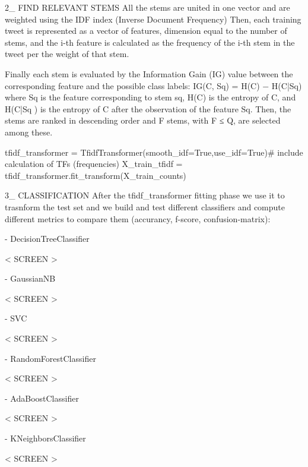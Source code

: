 \documentclass[a4paper]{article}
\begin{document}
                
                
2_ FIND RELEVANT STEMS
    All the stems are united in one vector and are weighted using the IDF index (Inverse Document Frequency)
    Then, each training tweet is represented as a vector of features, dimension equal to the number of stems, and the i-th feature is
    calculated as the frequency of the i-th stem in the tweet per the weight of that stem.

    Finally each stem is evaluated by the Information Gain (IG) value between the corresponding feature and the possible class labels:
        IG(C, Sq) = H(C) − H(C|Sq)
    where Sq is the feature corresponding to stem sq, H(C) is the entropy of C, and H(C|Sq ) is the entropy of C after the observation 
    of the feature Sq.
    Then, the stems are ranked in descending order and F stems, with F ≤ Q, are selected among these.
    
        tfidf_transformer = TfidfTransformer(smooth_idf=True,use_idf=True)# include calculation of TFs (frequencies) 
        X_train_tfidf = tfidf_transformer.fit_transform(X_train_counts)
        
        
3_ CLASSIFICATION
    After the tfidf_transformer fitting phase we use it to trasnform the test set and we build and test different classifiers and compute different metrics to compare them (accurancy, f-score, confusion-matrix):
    
    - DecisionTreeClassifier
        
        < SCREEN >

    - GaussianNB
        
        < SCREEN >

    - SVC 
        
        < SCREEN >

    - RandomForestClassifier
    
        < SCREEN >

    - AdaBoostClassifier
        
        < SCREEN >

    - KNeighborsClassifier
        
        < SCREEN >
        
\end{document}

